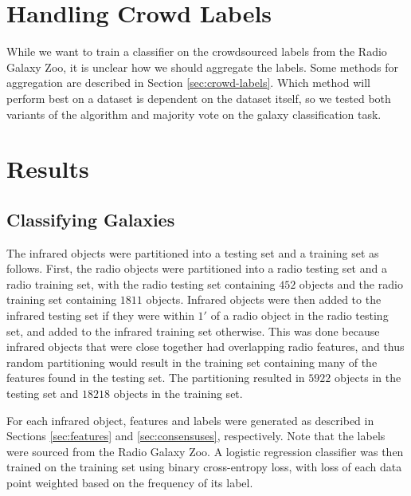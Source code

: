 \section{Handling Crowd Labels}
\label{sec:rgz-crowd-labels}

  While we want to train a classifier on the crowdsourced labels from the Radio
  Galaxy Zoo, it is unclear how we should aggregate the labels. Some methods for
  aggregation are described in Section \ref{sec:crowd-labels}. Which method will
  perform best on a dataset is dependent on the dataset itself, so we tested
  both variants of the \citeauthor{raykar10} algorithm and majority vote on the
  galaxy classification task.


\section{Results}
\label{sec:rgz-results}
  
  \subsection{Classifying Galaxies}


    The infrared objects were partitioned into a testing set and a training set
    as follows. First, the radio objects were partitioned into a radio testing
    set and a radio training set, with the radio testing set containing $452$
    objects and the radio training set containing $1811$ objects. Infrared
    objects were then added to the infrared testing set if they were within $1'$
    of a radio object in the radio testing set, and added to the infrared
    training set otherwise. This was done because infrared objects that were
    close together had overlapping radio features, and thus random partitioning
    would result in the training set containing many of the features found in
    the testing set. The partitioning resulted in $5922$ objects in the testing
    set and $18218$ objects in the training set.

    For each infrared object, features and labels were generated as described in
    Sections \ref{sec:features} and \ref{sec:consensuses}, respectively. Note
    that the labels were sourced from the Radio Galaxy Zoo. A logistic
    regression classifier was then trained on the training set using binary
    cross-entropy loss, with loss of each data point weighted based on the
    frequency of its label.

